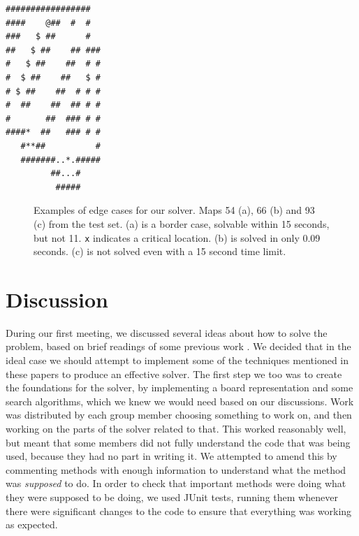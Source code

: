 \documentclass[a4paper,11pt]{article}
\begin{document}
\begin{lrbox}{\mapnt}
  \begin{minipage}{.25\textwidth}
\centering
\begin{BVerbatim}
#################  
####    @##  #  #  
###   $ ##      #  
##   $ ##    ## ###
#   $ ##    ##  # #
#  $ ##    ##   $ #
# $ ##    ##  # # #
#  ##    ##  ## # #
#       ##  ### # #
####*  ##   ### # #
   #**##          #
   #######..*.#####
         ##...#    
          #####
\end{BVerbatim}
  \end{minipage}
\end{lrbox}%


\begin{figure}
  \centering
  \subfloat[Unsolved]{\usebox{\mapnt}}
  \caption{Examples of edge cases for our solver. Maps 54 (a), 66 (b) and 93 (c) from the test set. (a) is a border case, solvable within 15 seconds, but not 11. \texttt{x} indicates a critical location. (b) is solved in only 0.09 seconds. (c) is not solved even with a 15 second time limit.}
\end{figure}

\section{Discussion}
During our first meeting, we discussed several ideas about how to solve the
problem, based on brief readings of some previous work \cite{virkkala, jung}. We
decided that in the ideal case we should attempt to implement some of the
techniques mentioned in these papers to produce an effective solver. The first
step we too was to create the foundations for the solver, by implementing a
board representation and some search algorithms, which we knew we would need
based on our discussions. Work was distributed by each group member choosing
something to work on, and then working on the parts of the solver related to
that. This worked reasonably well, but meant that some members did not fully
understand the code that was being used, because they had no part in writing
it. We attempted to amend this by commenting methods with enough information to
understand what the method was \emph{supposed} to do. In order to check that
important methods were doing what they were supposed to be doing, we used JUnit
tests, running them whenever there were significant changes to the code to
ensure that everything was working as expected.
\end{document}
